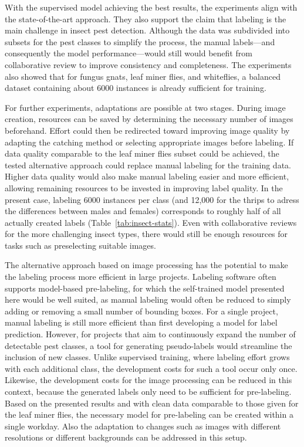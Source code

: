 \documentclass[12pt, a4paper]{article}
\begin{document}
With the supervised model achieving the best results, the experiments align with the state-of-the-art approach. They also support the claim that labeling is the main challenge in insect pest detection. Although the data was subdivided into subsets for the pest classes to simplify the process, the manual labels—and consequently the model performance—would still would benefit from collaborative review to improve consistency and completeness. The experiments also showed that for fungus gnats, leaf miner flies, and whiteflies, a balanced dataset containing about 6000 instances is already sufficient for training.

For further experiments, adaptations are possible at two stages. During image creation, resources can be saved by determining the necessary number of images beforehand. Effort could then be redirected toward improving image quality by adapting the catching method or selecting appropriate images before labeling. If data quality comparable to the leaf miner flies subset could be achieved, the tested alternative approach could replace manual labeling for the training data. Higher data quality would also make manual labeling easier and more efficient, allowing remaining resources to be invested in improving label quality. In the present case, labeling 6000 instances per class (and 12,000 for the thrips to adress the differences between males and females) corresponds to roughly half of all actually created labels (Table~\ref{tab:insect-stats}). Even with collaborative reviews for the more challenging insect types, there would still be enough resources for tasks such as preselecting suitable images.

The alternative approach based on image processing  has the potential to make the labeling process more efficient in large projects. Labeling software often supports model-based pre-labeling, for which the self-trained model presented here would be well suited, as manual labeling would often be reduced to simply adding or removing a small number of bounding boxes. For a single project, manual labeling is still more efficient than first developing a model for label prediction. However, for projects that aim to continuously expand the number of detectable pest classes, a tool for generating pseudo-labels would streamline the inclusion of new classes. Unlike supervised training, where labeling effort grows with each additional class, the development costs for such a tool occur only once. Likewise, the development costs for the image processing can be reduced in this context, because the generated labels only need to be sufficient for pre-labeling. Based on the presented results and with clean data comparable to those given for the leaf miner flies, the necessary model for pre-labeling can be created within a single workday. Also the adaptation to changes such as images with different resolutions or different backgrounds can be addressed in this setup.
\end{document}

